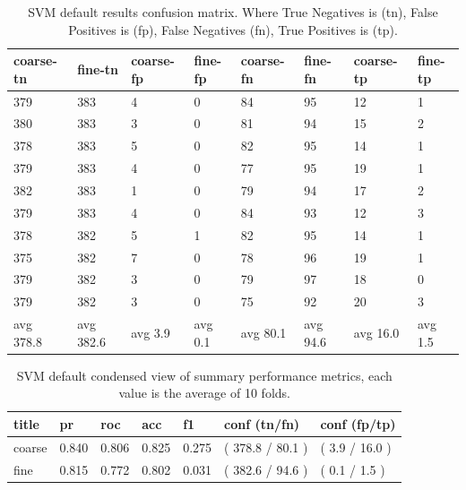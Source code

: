 \documentclass[ms]{nuthesis}
\begin{document}
\FloatBarrier
\begin{table}[H]
\centering
\begin{tabular}{|l||l||l||l||l||l||l||l|}\toprule
coarse-tn & fine-tn & coarse-fp & fine-fp & coarse-fn & fine-fn & coarse-tp & fine-tp \\ \midrule
379 & 383 & 4 & 0 & 84 & 95 & 12 & 1 \\
380 & 383 & 3 & 0 & 81 & 94 & 15 & 2 \\
378 & 383 & 5 & 0 & 82 & 95 & 14 & 1 \\
379 & 383 & 4 & 0 & 77 & 95 & 19 & 1 \\
382 & 383 & 1 & 0 & 79 & 94 & 17 & 2 \\
379 & 383 & 4 & 0 & 84 & 93 & 12 & 3 \\
378 & 382 & 5 & 1 & 82 & 95 & 14 & 1 \\
375 & 382 & 7 & 0 & 78 & 96 & 19 & 1 \\
379 & 382 & 3 & 0 & 79 & 97 & 18 & 0 \\
379 & 382 & 3 & 0 & 75 & 92 & 20 & 3 \\
avg 378.8 & avg 382.6 & avg 3.9 & avg 0.1 & avg 80.1 & avg 94.6 & avg 16.0 & avg 1.5 \\ \bottomrule
\end{tabular}
\caption{SVM default results confusion matrix. Where True Negatives is (tn), False Positives is (fp),
False Negatives (fn), True Positives is (tp).}
\label{tab:SVMDefConfMat}
\end{table}
\FloatBarrier

\FloatBarrier
\begin{table}[H]
\centering
\begin{tabular}{|l||l||l||l||l||l||l|}\toprule
title & pr & roc & acc & f1 & conf (tn/fn) & conf (fp/tp) \\ \midrule
coarse & 0.840 & 0.806 & 0.825 & 0.275 & ( 378.8 / 80.1 ) & ( 3.9 / 16.0 ) \\
fine & 0.815 & 0.772 & 0.802 & 0.031 & ( 382.6 / 94.6 ) & ( 0.1 / 1.5 ) \\ \bottomrule
\end{tabular}
\caption{SVM default condensed view of summary performance metrics, each value is the average
of 10 folds.}
\label{tab:SVMDef}
\end{table}
\FloatBarrier
\end{document}
